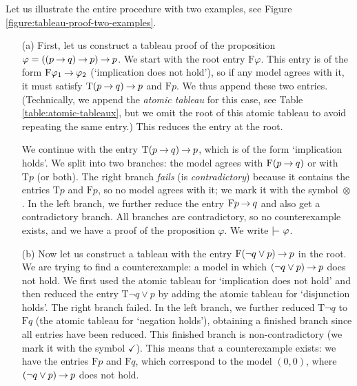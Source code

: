 \begin{example}\label{example:tableau-intro-examples}
Let us illustrate the entire procedure with two examples, see Figure \ref{figure:tableau-proof-two-examples}.
\begin{itemize}
    \item[(a)] First, let us construct a tableau proof of the proposition $\varphi = ((p \mathbin{\rightarrow} q) \mathbin{\rightarrow} p) \mathbin{\rightarrow} p$. We start with the root entry $\mathrm{F}\varphi$. This entry is of the form $\mathrm{F}\varphi_1 \mathbin{\rightarrow} \varphi_2$ (`implication does not hold'), so if any model agrees with it, it must satisfy $\mathrm{T}(p \mathbin{\rightarrow} q) \mathbin{\rightarrow} p$ and $\mathrm{F}p$. We thus append these two entries. (Technically, we append the \emph{atomic tableau} for this case, see Table \ref{table:atomic-tableaux}, but we omit the root of this atomic tableau to avoid repeating the same entry.) This reduces the entry at the root.
    
    We continue with the entry $\mathrm{T}(p \mathbin{\rightarrow} q) \mathbin{\rightarrow} p$, which is of the form `implication holds'. We split into two branches: the model agrees with $\mathrm{F}(p \mathbin{\rightarrow} q)$ or with $\mathrm{T}p$ (or both). The right branch \emph{fails} (is \emph{contradictory}) because it contains the entries $\mathrm{T}p$ and $\mathrm{F}p$, so no model agrees with it; we mark it with the symbol~$\otimes$. In the left branch, we further reduce the entry $\mathrm{F}p \mathbin{\rightarrow} q$ and also get a contradictory branch. All branches are contradictory, so no counterexample exists, and we have a proof of the proposition $\varphi$. We write $\proves \varphi$.
    
    \item[(b)] Now let us construct a tableau with the entry $\mathrm{F}(\neg q \lor p) \mathbin{\rightarrow} p$ in the root. We are trying to find a counterexample: a model in which $(\neg q \lor p) \mathbin{\rightarrow} p$ does not hold. We first used the atomic tableau for `implication does not hold' and then reduced the entry $\mathrm{T}\neg q \lor p$ by adding the atomic tableau for `disjunction holds'. The right branch failed. In the left branch, we further reduced $\mathrm{T}\neg q$ to $\mathrm{F}q$ (the atomic tableau for `negation holds'), obtaining a finished branch since all entries have been reduced. This finished branch is non-contradictory (we mark it with the symbol $\checkmark$). This means that a counterexample exists: we have the entries $\mathrm{F}p$ and $\mathrm{F}q$, which correspond to the model $(0,0)$, where $(\neg q \lor p) \mathbin{\rightarrow} p$ does not hold.


\end{itemize}
\end{example}
